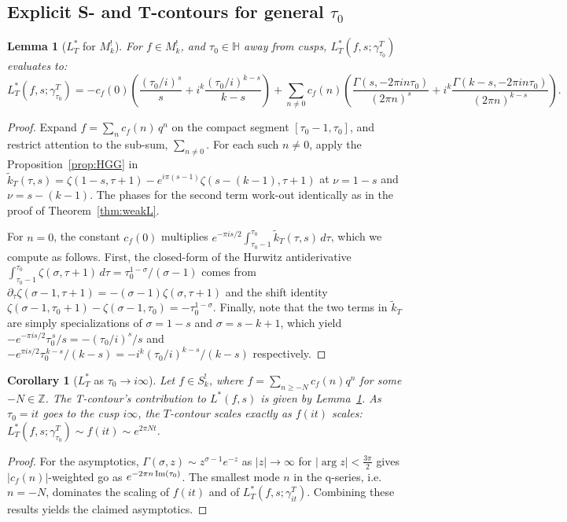 \documentclass[11pt]{article}
\newtheorem{lemma}[theorem]{Lemma}
\newtheorem{corollary}[theorem]{Corollary}
\newcommand{\HH}{\mathbb{H}}
\newcommand{\ZZ}{\mathbb{Z}}
\newcommand{\tk}{\widetilde{k}_T}
\begin{document}
\subsection{Explicit S- and T-contours for general $\tau_0$}

\begin{lemma}[$L^*_T$ for $M^!_k$]\label{lem:Tclosed-Mk}
For $f\in M^!_k$, and $\tau_0 \in \HH$ away from cusps, 
$L^*_T(f, s; \gamma^T_{\tau_0})$ evaluates to:
\begin{equation}\label{eq:T-segment-closed-Mk}
L_T^*(f, s; \gamma^T_{\tau_0})
= -c_f(0)\!\left(\frac{(\tau_0/i)^{s}}{s} + i^k\frac{(\tau_0/i)^{k-s}}{k-s}\right) + \sum_{n \ne 0}\! c_f(n)\!\left(\frac{\Gamma(s, -2\pi i n\tau_0)}{(2\pi n)^s} + i^k\frac{\Gamma(k - s, -2\pi i n\tau_0)}{(2\pi n)^{k-s}}\right).
\end{equation}
\end{lemma}
\begin{proof}
Expand $f = \sum_n c_f(n)\,q^n$ on the compact segment
$[\tau_0 - 1, \tau_0]$, and restrict attention to the sub-sum, $\sum_{n \neq 0}$. 
For each such $n \neq 0$, apply the Proposition~\ref{prop:HGG} in
$\widetilde{k}_T(\tau, s) = \zeta(1 - s, \tau + 1) - e^{i\pi(s-1)}\zeta(s - (k-1), \tau + 1)$
at $\nu = 1 - s$ and $\nu = s - (k - 1)$. The phases for the second term work-out 
identically as in the proof of Theorem~\ref{thm:weakL}.  

For $n = 0$, the constant $c_f(0)$ multiplies $e^{-\pi i s/2}\!\int_{\tau_0 - 1}^{\tau_0}\!\widetilde k_T(\tau, s)\,d\tau$, 
which we compute as follows. First, the closed-form of the Hurwitz antiderivative 
$\int_{\tau_0 - 1}^{\tau_0}\zeta(\sigma, \tau + 1)\,d\tau = \tau_0^{1 - \sigma}/(\sigma - 1)$
comes from $\partial_\tau\zeta(\sigma - 1, \tau + 1) = -(\sigma - 1)\zeta(\sigma, \tau + 1)$ 
and the shift identity $\zeta(\sigma - 1, \tau_0 + 1) - \zeta(\sigma - 1, \tau_0) = -\tau_0^{1 - \sigma}$. 
Finally, note that the two terms in $\tk$ are simply specializations of $\sigma = 1 - s$ and $\sigma = s - k + 1$, 
which yield $-e^{-\pi i s/2}\tau_0^{\,s}/s = -(\tau_0/i)^s/s$ and 
$-e^{\pi i s/2}\tau_0^{\,k-s}/(k-s) = -i^k(\tau_0/i)^{k-s}/(k-s)$ respectively.
\end{proof}


\begin{corollary}[$L^*_T$ as $\tau_0 \to i \infty$]\label{lem:cusp-decay}
Let $f \in S^!_k$, where $f = \sum_{n \geq -N} c_f(n)q^n$ for some $-N \in \ZZ$. 
The T-contour's contribution to $L^*(f,s)$ is given by 
Lemma~\ref{lem:Tclosed-Mk}. As $\tau_0 = it$ goes to the cusp $i\infty$,
the $T$-contour scales exactly as $f(it)$ scales:
$L_T^*(f, s; \gamma^T_{\tau_0}) \sim f(it) \sim e^{2\pi N t}$.
\end{corollary}
\begin{proof}
For the asymptotics, $\Gamma(\sigma, z) \sim z^{\sigma - 1}e^{-z}$
as $|z| \to \infty$ for $|\arg z| < \tfrac{3\pi}{2}$ \cite[\S8.11]{DLMF}
gives $|c_f(n)|$-weighted go as $e^{-2\pi n\,{\rm Im}(\tau_0)}$.  The smallest 
mode $n$ in the q-series, i.e. $n = -N$, dominates the scaling of $f(it)$ and of 
$L^*_T(f, s; \gamma^T_{i t})$. Combining these results yields the claimed asymptotics.
\end{proof}
\end{document}
